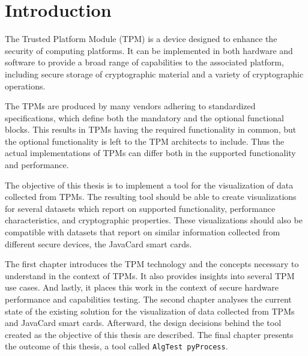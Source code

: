 \chapter{Introduction}
The Trusted Platform Module (TPM) is a device designed to enhance the security of computing platforms. It can be implemented in both hardware and software to provide a broad range of capabilities to the associated platform, including secure storage of cryptographic material and a variety of cryptographic operations.

The TPMs are produced by many vendors adhering to standardized specifications, which define both the mandatory and the optional functional blocks. This results in TPMs having the required functionality in common, but the optional functionality is left to the TPM architects to include. Thus the actual implementations of TPMs can differ both in the supported functionality and performance.

The objective of this thesis is to implement a tool for the visualization of data collected from TPMs. The resulting tool should be able to create visualizations for several datasets which report on supported functionality, performance characteristics, and cryptographic properties. These visualizations should also be compatible with datasets that report on similar information collected from different secure devices, the JavaCard smart cards.

The first chapter introduces the TPM technology and the concepts necessary to understand in the context of TPMs. It also provides insights into several TPM use cases. And lastly, it places this work in the context of secure hardware performance and capabilities testing. The second chapter analyses the current state of the existing solution for the visualization of data collected from TPMs and JavaCard smart cards. Afterward, the design decisions behind the tool created as the objective of this thesis are described. The final chapter presents the outcome of this thesis, a tool called \texttt{AlgTest pyProcess}.
